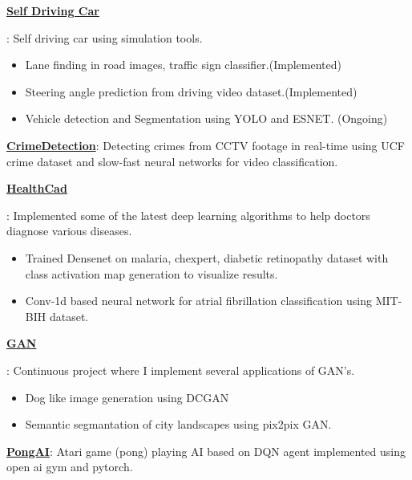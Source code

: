 \documentclass[letterpaper,10.9pt]{article}
\newcommand{\resumeItem}[2]{
  \item\small{
    \textbf{#1}{: #2 \vspace{-2pt}}
  }
}
\newcommand{\resumeSubItem}[2]{\resumeItem{#1}{#2}\vspace{-4pt}}
\begin{document}
    \resumeSubItem{\color{blue}\href{https://github.com/sanchit2843/SelfDrivingCar}{Self Driving Car}}
      {
      Self driving car using simulation tools.
        \vspace{-5pt}
        \begin{itemize}
            \item Lane finding in road images, traffic sign classifier.(Implemented)
            \item Steering angle prediction from driving video dataset.(Implemented)
            \item Vehicle detection and Segmentation using YOLO and ESNET. (Ongoing)
        \end{itemize}
      }
      
    \resumeSubItem{\color{blue}\href{https://github.com/sanchit2843/Videoclassification}{CrimeDetection}}
      {Detecting crimes from CCTV footage in real-time using UCF crime dataset and slow-fast neural networks for video classification.}
      
      
    \resumeSubItem{\color{blue}\href{https://github.com/sanchit2843/healthcad}{HealthCad}}
      {Implemented some of the latest deep learning algorithms to help doctors diagnose various diseases.
        \vspace{-5pt}
        \begin{itemize}
            \item Trained Densenet on malaria, chexpert, diabetic retinopathy dataset with class activation map generation to visualize results. 
            \item Conv-1d based neural network for atrial fibrillation classification using MIT-BIH dataset. 
        \end{itemize}
      }
      
      \resumeSubItem{\color{blue}\href{https://github.com/sanchit2843/GAN-applications}{GAN}}
      {Continuous project where I implement several applications of GAN's.
        \vspace{-5pt}
        \begin{itemize}
            \item Dog like image generation using DCGAN
            \item Semantic segmantation of city landscapes using pix2pix GAN.
        \end{itemize}
      }
      
      \resumeSubItem{\color{blue}\href{https://github.com/sanchit2843/Reinforcementlearningprojects}{PongAI}}
      { Atari game (pong) playing AI based on DQN agent implemented using open ai gym and pytorch.
      }
      
\end{document}
